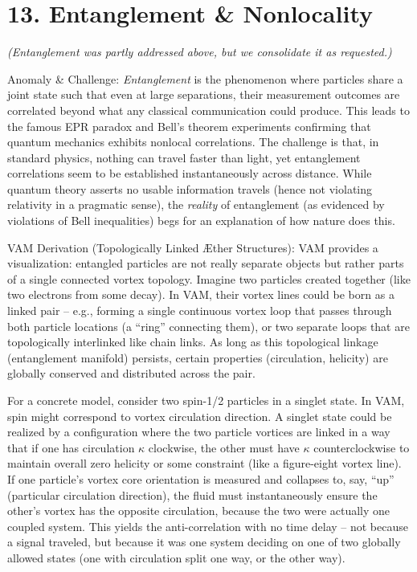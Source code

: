 \documentclass[a4paper, aps,preprint,superscriptaddress, 12pt]{revtex4}
\begin{document}
\section*{13. Entanglement \& Nonlocality}

\textit{(Entanglement was partly addressed above, but we consolidate it as requested.)}


Anomaly \& Challenge: \textit{Entanglement} is the phenomenon where particles share a joint state such that even at large separations, their measurement outcomes are correlated beyond what any classical communication could produce. This leads to the famous EPR paradox and Bell’s theorem experiments confirming that quantum mechanics exhibits nonlocal correlations. The challenge is that, in standard physics, nothing can travel faster than light, yet entanglement correlations seem to be established instantaneously across distance. While quantum theory asserts no usable information travels (hence not violating relativity in a pragmatic sense), the \textit{reality} of entanglement (as evidenced by violations of Bell inequalities) begs for an explanation of how nature does this.


VAM Derivation (Topologically Linked Æther Structures): VAM provides a visualization: entangled particles are not really separate objects but rather parts of a single connected vortex topology. Imagine two particles created together (like two electrons from some decay). In VAM, their vortex lines could be born as a linked pair – e.g., forming a single continuous vortex loop that passes through both particle locations (a “ring” connecting them), or two separate loops that are topologically interlinked like chain links. As long as this topological linkage (entanglement manifold) persists, certain properties (circulation, helicity) are globally conserved and distributed across the pair.


For a concrete model, consider two spin-1/2 particles in a singlet state. In VAM, spin might correspond to vortex circulation direction. A singlet state could be realized by a configuration where the two particle vortices are linked in a way that if one has circulation $\kappa$ clockwise, the other must have $\kappa$ counterclockwise to maintain overall zero helicity or some constraint (like a figure-eight vortex line). If one particle’s vortex core orientation is measured and collapses to, say, “up” (particular circulation direction), the fluid must instantaneously ensure the other’s vortex has the opposite circulation, because the two were actually one coupled system. This yields the anti-correlation with no time delay – not because a signal traveled, but because it was one system deciding on one of two globally allowed states (one with circulation split one way, or the other way).
\end{document}
